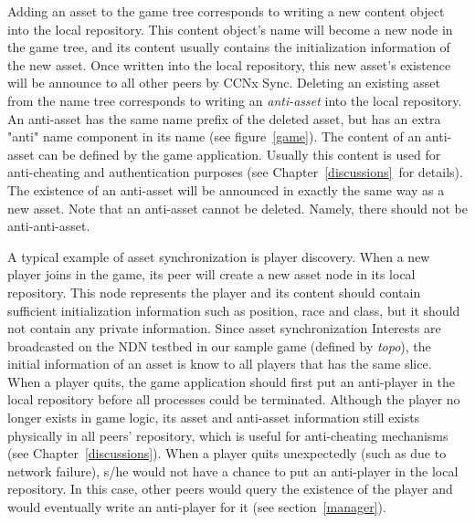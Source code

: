 Adding an asset to the game tree corresponds to writing a new content object into the local repository. This content object's name will become a new node in the game tree, and its content usually contains the initialization information of the new asset. Once written into the local repository, this new asset's existence will be announce to all other peers by CCNx Sync. Deleting an existing asset from the name tree corresponds to writing an \emph{anti-asset} into the local repository. An anti-asset has the same name prefix of the deleted asset, but has an extra "{anti}" name component in its name (see figure~\ref{game}). The content of an anti-asset can be defined by the game application. Usually this content is used for anti-cheating and authentication purposes (see Chapter~\ref{discussions}~for details). The existence of an anti-asset will be announced in exactly the same way as a new asset. Note that an anti-asset cannot be deleted. Namely, there should not be anti-anti-asset. 

A typical example of asset synchronization is player discovery. When a new player joins in the game, its peer will create a new asset node in its local repository. This node represents the player and its content should contain sufficient initialization information such as position, race and class, but it should not contain any private information. Since asset synchronization Interests are broadcasted on the NDN testbed in our sample game (defined by \emph{topo}), the initial information of an asset is know to all players that has the same slice. When a player quits, the game application should first put an anti-player in the local repository before all processes could be terminated. Although the player no longer exists in game logic, its asset and anti-asset information still exists physically in all peers' repository, which is useful for anti-cheating mechanisms (see Chapter~\ref{discussions}). When a player quits unexpectedly (such as due to network failure), s/he would not have a chance to put an anti-player in the local repository. In this case, other peers would query the existence of the player and would eventually write an anti-player for it (see section~\ref{manager}).

